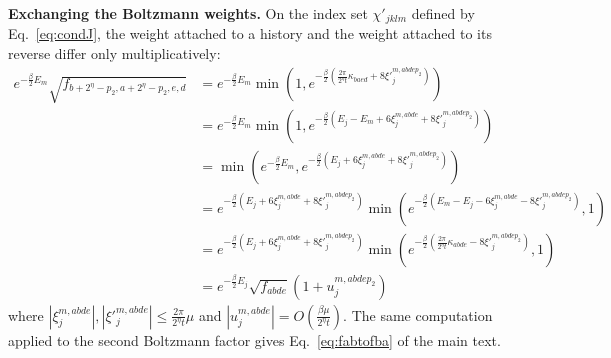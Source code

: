\documentclass[aps,floatfix,10pt,amssymb,amsfont,amsmath,superscriptaddress,float,nofootinbib,longbibliography,nobalancelastpage,twocolumn]{revtex4-2}
\begin{document}


\smallskip
\noindent\textbf{Exchanging the Boltzmann weights.} On the index set $\chi'_{jklm}$ defined by Eq.~\eqref{eq:condJ}, the weight attached to a history and the weight attached to its reverse differ only multiplicatively:
\begin{equation}
    \begin{aligned}
    e^{-\frac{\beta}{2}E_m}\sqrt{f_{b+2^{\eta}-p_2,a+2^{\eta}-p_2,e,d}} &= e^{-\frac{\beta}{2}E_m}\min(1,e^{-\frac{\beta}{2}(\frac{2\pi}{2^{\eta}t}\kappa_{baed}+ 8\xi'^{m,abdep_2}_j)})\\
    &= e^{-\frac{\beta}{2}E_m}\min(1,e^{-\frac{\beta}{2}(E_j-E_m + 6\xi^{m,abde}_j+ 8\xi'^{m,abdep_2}_j)})\\
    &= \min\!\left(e^{-\frac{\beta}{2}E_m}, e^{-\frac{\beta}{2}(E_j + 6\xi^{m,abde}_j+ 8\xi'^{m,abdep_2}_j)}\right)\\
    &= e^{-\frac{\beta}{2}(E_j+ 6\xi^{m,abde}_j+ 8\xi'^{m,abdep_2}_j)} \min(e^{-\frac{\beta}{2}(E_m-E_j-6\xi^{m,abde}_j- 8\xi'^{m,abdep_2}_j)},1)\\
     &= e^{-\frac{\beta}{2}(E_j+ 6\xi^{m,abde}_j+ 8\xi'^{m,abdep_2}_j)} \min(e^{-\frac{\beta}{2}(\frac{2\pi}{2^{\eta}t}\kappa_{abde}- 8\xi'^{m,abdep_2}_j)},1)\\
    &= e^{-\frac{\beta}{2}E_j}\sqrt{f_{abde}}(1+u^{m,abdep_2}_j)
\end{aligned}
\label{eq:boltzexchange}
\end{equation}
where $|\xi^{m,abde}_j|,|\xi'^{m,abde}_j| \leq \frac{2\pi}{2^{\eta}t}\mu$
and $|u^{m,abde}_j| = O(\frac{\beta \mu}{2^{\eta}t})$. The same computation applied to the second Boltzmann factor gives Eq.~\eqref{eq:fabtofba} of the main text.
\end{document}

